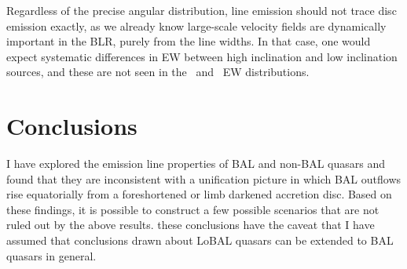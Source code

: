Regardless of the precise angular distribution, 
line emission should not trace disc emission
exactly, as we already know large-scale velocity fields are dynamically important
in the BLR, purely from the line widths. In that case, one would expect systematic
differences in EW between high inclination and low inclination sources, and these are 
not seen in the \civline\ and \mgline\ EW distributions.

\section{Conclusions}
\label{sec:ew_conclusions}
I have explored the emission line properties of BAL and non-BAL quasars 
and found that they are inconsistent with a unification picture in which 
BAL outflows rise equatorially from a foreshortened or limb darkened accretion
disc. Based on these findings, it is possible to 
construct a few possible scenarios that are not ruled out by the above results.
these conclusions have the caveat that I have assumed that conclusions drawn about
LoBAL quasars can be extended to BAL quasars in general.
